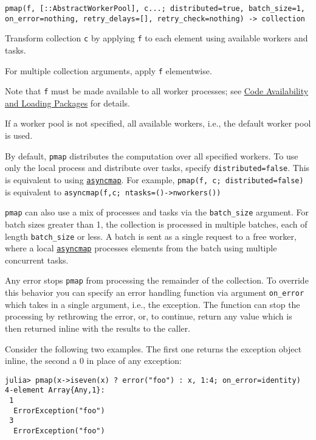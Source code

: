 \begin{adjustwidth}{2em}{0pt}


\begin{verbatim}
pmap(f, [::AbstractWorkerPool], c...; distributed=true, batch_size=1, on_error=nothing, retry_delays=[], retry_check=nothing) -> collection
\end{verbatim}

Transform collection \texttt{c} by applying \texttt{f} to each element using available workers and tasks.

For multiple collection arguments, apply \texttt{f} elementwise.

Note that \texttt{f} must be made available to all worker processes; see \hyperlink{9531684934388013797}{Code Availability and Loading Packages} for details.

If a worker pool is not specified, all available workers, i.e., the default worker pool is used.

By default, \texttt{pmap} distributes the computation over all specified workers. To use only the local process and distribute over tasks, specify \texttt{distributed=false}. This is equivalent to using \hyperlink{14148755671315265621}{\texttt{asyncmap}}. For example, \texttt{pmap(f, c; distributed=false)} is equivalent to \texttt{asyncmap(f,c; ntasks=()->nworkers())}

\texttt{pmap} can also use a mix of processes and tasks via the \texttt{batch\_size} argument. For batch sizes greater than 1, the collection is processed in multiple batches, each of length \texttt{batch\_size} or less. A batch is sent as a single request to a free worker, where a local \hyperlink{14148755671315265621}{\texttt{asyncmap}} processes elements from the batch using multiple concurrent tasks.

Any error stops \texttt{pmap} from processing the remainder of the collection. To override this behavior you can specify an error handling function via argument \texttt{on\_error} which takes in a single argument, i.e., the exception. The function can stop the processing by rethrowing the error, or, to continue, return any value which is then returned inline with the results to the caller.

Consider the following two examples. The first one returns the exception object inline, the second a 0 in place of any exception:


\begin{verbatim}
julia> pmap(x->iseven(x) ? error("foo") : x, 1:4; on_error=identity)
4-element Array{Any,1}:
 1
  ErrorException("foo")
 3
  ErrorException("foo")


\end{verbatim}
\end{adjustwidth}
